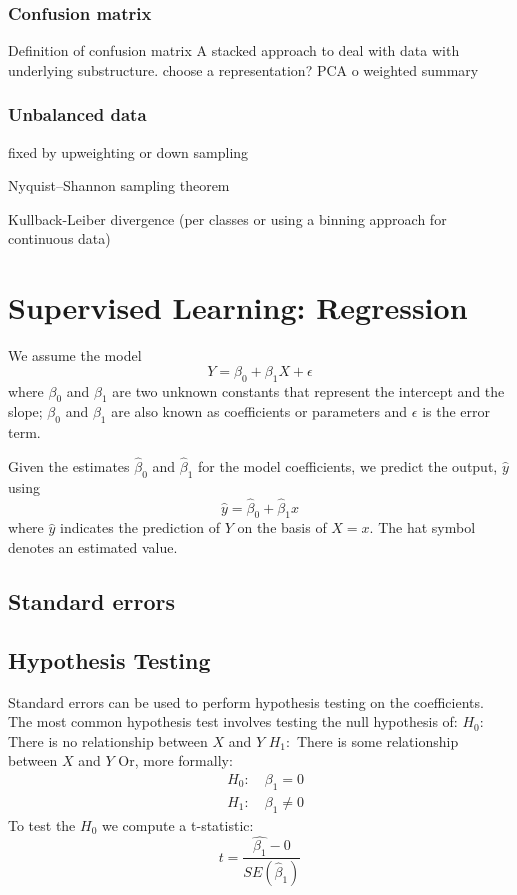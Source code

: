 \documentclass[12pt,a4paper]{article}
\begin{document}
\subsubsection{Confusion matrix}
Definition of confusion matrix
A stacked approach to deal with data with underlying substructure.
choose a representation? PCA
o weighted summary
\subsubsection{Unbalanced data}
fixed by upweighting or down sampling
\begin{theorem}
    {Nyquist–Shannon sampling theorem}{}
\end{theorem}
\begin{theorem}
    {Kullback-Leiber divergence (per classes or using a binning approach for continuous data)
    }{}
\end{theorem}
\section{Supervised Learning: Regression}
We assume the model
$$
Y=\beta_0+\beta_1 X+\epsilon
$$
where $\beta_0$ and $\beta_1$ are two unknown constants that represent the intercept and the slope; $\beta_0$ and $\beta_1$ are also known as coefficients or parameters and $\epsilon$ is the error term.

Given the estimates $\hat{\beta}_0$ and $\hat{\beta}_1$ for the model coefficients, we predict the output, $\hat{y}$ using
$$
\hat{y}=\hat{\beta}_0+\hat{\beta}_1 x
$$
where $\hat{y}$ indicates the prediction of $Y$ on the basis of $X=x$. The hat symbol denotes an estimated value.
\subsection{Standard errors}
\subsection{Hypothesis Testing}
Standard errors can be used to perform hypothesis testing on the coefficients. The most common hypothesis test involves testing the null hypothesis of:
$H_0:$ There is no relationship between $X$ and $Y$
$H_1:$ There is some relationship between $X$ and $Y$
Or, more formally:
$$
\begin{aligned}
& H_0: \quad \beta_1=0 \\
& H_1: \quad \beta_1 \neq 0
\end{aligned}
$$
To test the $H_0$ we compute a t-statistic:
$$
t=\frac{\hat{\beta_1}-0}{S E\left(\hat{\beta}_1\right)}
$$
\end{document}
